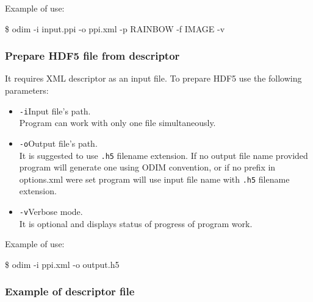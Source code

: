 \documentclass[11p]{article}
\begin{document}
Example of use:

\begin{kod}
\$ odim -i input.ppi -o ppi.xml -p RAINBOW -f IMAGE -v
\end{kod}

\subsubsection*{Prepare HDF5 file from descriptor}

It requires XML descriptor as an input file. To prepare HDF5 use the following
parameters:

\begin{itemize}
  \renewcommand{\labelitemi}{ }
  \item \texttt{-i}\hspace{0.5cm}Input file's path.\\Program can work with
  only one file simultaneously.
  \item \texttt{-o}\hspace{0.5cm}Output file's path.\\It is suggested to use
  \texttt{.h5} filename extension. If no output file name provided program will
  generate one using ODIM convention, or if no prefix in options.xml were set
  program will use input file name with \texttt{.h5} filename extension.
  \item \texttt{-v}\hspace{0.5cm}Verbose mode.\\It is optional and displays
  status of progress of program work.
\end{itemize}

Example of use:

\begin{kod}
\$ odim -i ppi.xml -o output.h5
\end{kod}

\subsubsection*{Example of descriptor file}
\end{document}
